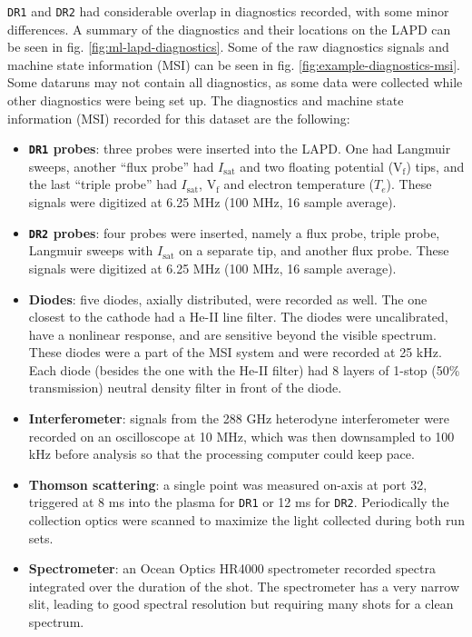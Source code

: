 \texttt{DR1} and \texttt{DR2} had considerable overlap in diagnostics recorded, with some minor differences. A summary of the diagnostics and their locations on the LAPD can be seen in fig. \ref{fig:ml-lapd-diagnostics}. Some of the raw diagnostics signals and machine state information (MSI) can be seen in fig. \ref{fig:example-diagnostics-msi}. Some dataruns may not contain all diagnostics, as some data were collected while other diagnostics were being set up. The diagnostics and machine state information (MSI) recorded for this dataset are the following:
\begin{itemize}
	\item \textbf{\texttt{DR1} probes}: three probes were inserted into the LAPD. One had Langmuir sweeps, another ``flux probe'' had $I_\text{sat}$ and two floating potential (V$_\text{f}$) tips, and the last ``triple probe'' had $I_\text{sat}$, V$_\text{f}$ and electron temperature ($T_e$). These signals were digitized at 6.25 MHz (100 MHz, 16 sample average).
	\item \textbf{\texttt{DR2} probes}: four probes were inserted, namely a flux probe, triple probe, Langmuir sweeps with $I_\text{sat}$ on a separate tip, and another flux probe. These signals were digitized at 6.25 MHz (100 MHz, 16 sample average).
	\item \textbf{Diodes}: five diodes, axially distributed, were recorded as well. The one closest to the cathode had a He-II line filter. The diodes were uncalibrated, have a nonlinear response, and are sensitive beyond the visible spectrum. These diodes were a part of the MSI system and were recorded at 25 kHz. Each diode (besides the one with the He-II filter) had 8 layers of 1-stop (50\% transmission) neutral density filter in front of the diode.
	\item \textbf{Interferometer}: signals from the 288 GHz heterodyne interferometer were recorded on an oscilloscope at 10 MHz, which was then downsampled to 100 kHz before analysis so that the processing computer could keep pace.
	\item \textbf{Thomson scattering}: a single point was measured on-axis at port 32, triggered at 8 ms into the plasma for \texttt{DR1} or 12 ms for \texttt{DR2}. Periodically the collection optics were scanned to maximize the light collected during both run sets.
	\item \textbf{Spectrometer}: an Ocean Optics HR4000 spectrometer recorded spectra integrated over the duration of the shot. The spectrometer has a very narrow slit, leading to good spectral resolution but requiring many shots for a clean spectrum.

\end{itemize}
